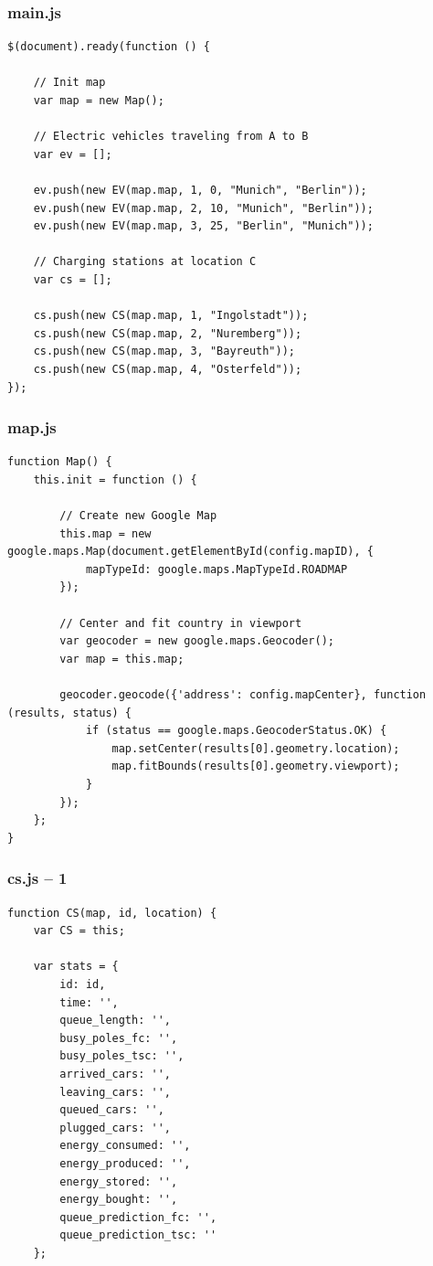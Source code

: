\begin{frame}[fragile]
\frametitle{main.js}

\begin{verbatim}
$(document).ready(function () {

    // Init map
    var map = new Map();

    // Electric vehicles traveling from A to B
    var ev = [];

    ev.push(new EV(map.map, 1, 0, "Munich", "Berlin"));
    ev.push(new EV(map.map, 2, 10, "Munich", "Berlin"));
    ev.push(new EV(map.map, 3, 25, "Berlin", "Munich"));

    // Charging stations at location C
    var cs = [];

    cs.push(new CS(map.map, 1, "Ingolstadt"));
    cs.push(new CS(map.map, 2, "Nuremberg"));
    cs.push(new CS(map.map, 3, "Bayreuth"));
    cs.push(new CS(map.map, 4, "Osterfeld"));
});
\end{verbatim}

\end{frame}
\clearpage



\begin{frame}[fragile]
\frametitle{map.js}

\begin{verbatim}
function Map() {
    this.init = function () {

        // Create new Google Map
        this.map = new google.maps.Map(document.getElementById(config.mapID), {
            mapTypeId: google.maps.MapTypeId.ROADMAP
        });

        // Center and fit country in viewport
        var geocoder = new google.maps.Geocoder();
        var map = this.map;

        geocoder.geocode({'address': config.mapCenter}, function (results, status) {
            if (status == google.maps.GeocoderStatus.OK) {
                map.setCenter(results[0].geometry.location);
                map.fitBounds(results[0].geometry.viewport);
            }
        });
    };
}
\end{verbatim}

\end{frame}
\clearpage



\begin{frame}[fragile]
\frametitle{cs.js – 1}

\begin{verbatim}
function CS(map, id, location) {
    var CS = this;

    var stats = {
        id: id,
        time: '',
        queue_length: '',
        busy_poles_fc: '',
        busy_poles_tsc: '',
        arrived_cars: '',
        leaving_cars: '',
        queued_cars: '',
        plugged_cars: '',
        energy_consumed: '',
        energy_produced: '',
        energy_stored: '',
        energy_bought: '',
        queue_prediction_fc: '',
        queue_prediction_tsc: ''
    };
\end{verbatim}

\end{frame}
\clearpage



